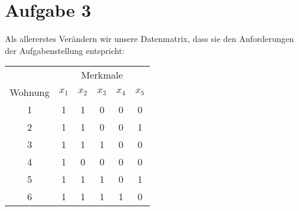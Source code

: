 \documentclass{article}
\begin{document}
	\section*{Aufgabe 3}
	Als allererstes Verändern wir unsere Datenmatrix, dass sie den Anforderungen der Aufgabenstellung entspricht:
	\begin{center}
		\begin{tabular}{c|ccccc}
			& \multicolumn{5}{c}{Merkmale} \\
			\cline{2-6}
			Wohnung & $x_1$ & $x_2$ & $x_3$ & $x_4$ & $x_5$ \\
			\hline
			1 & 1 & 1 & 0 & 0 & 0 \\
			2 & 1 & 1 & 0 & 0 & 1 \\
			3 & 1 & 1 & 1 & 0 & 0 \\
			4 & 1 & 0 & 0 & 0 & 0 \\
			5 & 1 & 1 & 1 & 0 & 1 \\
			6 & 1 & 1 & 1 & 1 & 0
		\end{tabular}
	\end{center}
\end{document}
